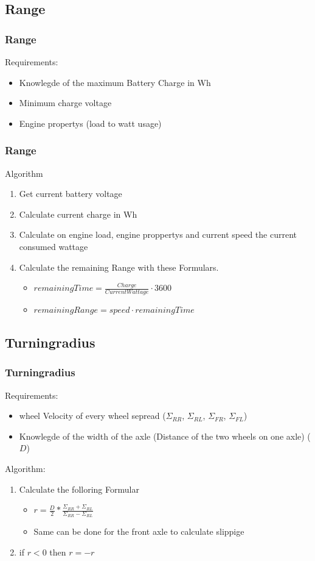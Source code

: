 \documentclass{beamer}
\begin{document}
\subsection{Range}
\begin{frame}
    \frametitle{Range}
    Requirements:
    \begin{itemize}
        \item Knowlegde of the maximum Battery Charge in Wh
        \item Minimum charge voltage
        \item Engine propertys (load to watt usage)
    \end{itemize}
\end{frame}
\begin{frame}
    \frametitle{Range}
    Algorithm
    \begin{enumerate}
     \item Get current battery voltage
     \item Calculate current charge in Wh
     \item Calculate on engine load, engine proppertys and current speed the current consumed wattage
     \item Calculate the remaining Range with these Formulars.
     \begin{itemize}
        \item $remainingTime=\frac{Charge}{Current Wattage}\cdot3600$
        \item $remainingRange=speed\cdot remainingTime$
     \end{itemize}
    \end{enumerate}
\end{frame}
\subsection{Turningradius}

\begin{frame}
    \frametitle{Turningradius}
    Requirements:
    \begin{itemize}
     \item wheel Velocity of every wheel sepread ($\Sigma_{RR}$, $\Sigma_{RL}$, $\Sigma_{FR}$, $\Sigma_{FL}$)
     \item Knowlegde of the width of the axle (Distance of the two wheels on one axle) ($D$)
    \end{itemize}
    Algorithm:
    \begin{enumerate}
     \item Calculate the folloring Formular
     \begin{itemize}
        \item $r=\frac{D}{2}*\frac{\Sigma_{RR}+\Sigma_{RL}}{\Sigma_{RR}-\Sigma_{RL}}$
        \item Same can be done for the front axle to calculate slippige
     \end{itemize}
     \item if $r<0$ then $r=-r$
    \end{enumerate}
\end{frame}
\end{document}

